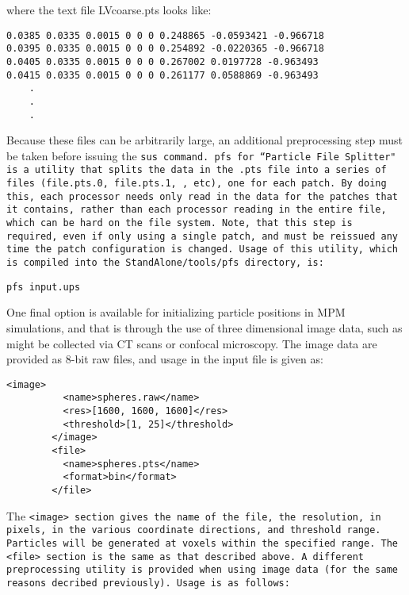 where the text file LVcoarse.pts looks like:

\begin{Verbatim}[fontsize=\footnotesize]
0.0385 0.0335 0.0015 0 0 0 0.248865 -0.0593421 -0.966718
0.0395 0.0335 0.0015 0 0 0 0.254892 -0.0220365 -0.966718
0.0405 0.0335 0.0015 0 0 0 0.267002 0.0197728 -0.963493
0.0415 0.0335 0.0015 0 0 0 0.261177 0.0588869 -0.963493
	.
	.
	.
\end{Verbatim}
Because these files can be arbitrarily large, an additional preprocessing step
must be taken before issuing the \tt sus \normalfont command.
\tt pfs \normalfont for ``Particle File Splitter" is a utility that splits the
data in the \tt .pts \normalfont file into a series of files
(\tt file.pts.0, file.pts.1, \normalfont, etc), one for each
patch.  By doing this, each processor needs only read in the data for the
patches that it contains, rather than each processor reading in the entire file,
which can be hard on the file system.  Note, that this step is required,
even if only using a single patch, and must be reissued any time the patch
configuration is changed.  Usage of this utility, which is compiled
into the \tt StandAlone/tools/pfs \normalfont directory, is:

\begin{Verbatim}[fontsize=\footnotesize]
   pfs input.ups
\end{Verbatim}

One final option is available for initializing particle positions in MPM
simulations, and that is through the use of three dimensional image data,
such as might be collected via CT scans or confocal microscopy.  The image data are provided as 8-bit raw files, and usage in the input file is given as:

\begin{Verbatim}[fontsize=\footnotesize]
        <image>
          <name>spheres.raw</name>
          <res>[1600, 1600, 1600]</res>
          <threshold>[1, 25]</threshold>
        </image>
        <file>
          <name>spheres.pts</name>
          <format>bin</format>
        </file>
\end{Verbatim}

The \tt <image> \normalfont section gives the name of the file, the resolution, in pixels,
in the various coordinate directions, and threshold range.  Particles will be
generated at voxels within the specified range.  The \tt <file> \normalfont
section is the same as that described above.  A different preprocessing utility
is provided when using image data (for the same reasons decribed previously).
Usage is as follows:

